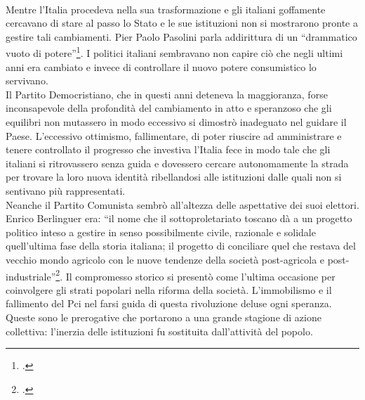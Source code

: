 \paragraph{}Mentre l'Italia procedeva nella sua trasformazione e gli italiani goffamente cercavano di stare al passo lo Stato e le sue istituzioni non si mostrarono pronte a gestire tali cambiamenti.
Pier Paolo Pasolini parla addirittura di un \enquote{drammatico vuoto di potere}\footcite{Scritti7}.
I politici italiani sembravano non capire ciò che negli ultimi anni era cambiato e invece di controllare il nuovo potere consumistico lo servivano.
\\Il Partito Democristiano, che in questi anni deteneva la maggioranza, forse inconsapevole della profondità del cambiamento in atto e speranzoso che gli equilibri non mutassero in modo eccessivo si dimostrò inadeguato nel guidare il Paese.
L'eccessivo ottimismo, fallimentare, di poter riuscire ad amministrare e tenere controllato il progresso che investiva l'Italia fece in modo tale che gli italiani si ritrovassero senza guida e dovessero cercare autonomamente la strada per trovare la loro nuova identità ribellandosi alle istituzioni dalle quali non si sentivano più rappresentati.
\\Neanche il Partito Comunista sembrò all'altezza delle aspettative dei suoi elettori.
Enrico Berlinguer era: \enquote{il nome che il sottoproletariato toscano dà a un progetto politico inteso a gestire in senso possibilmente civile, razionale e solidale quell'ultima fase della storia italiana; il progetto di conciliare quel che restava del vecchio mondo agricolo con le nuove tendenze della società post-agricola e post-industriale}\footcite{Brugnolo}.
Il compromesso storico si presentò come l'ultima occasione per coinvolgere gli strati popolari nella riforma della società.
L'immobilismo e il fallimento del Pci nel farsi guida di questa rivoluzione deluse ogni speranza.
\\Queste sono le prerogative che portarono a una grande stagione di azione collettiva: l'inerzia delle istituzioni fu sostituita dall'attività del popolo.

